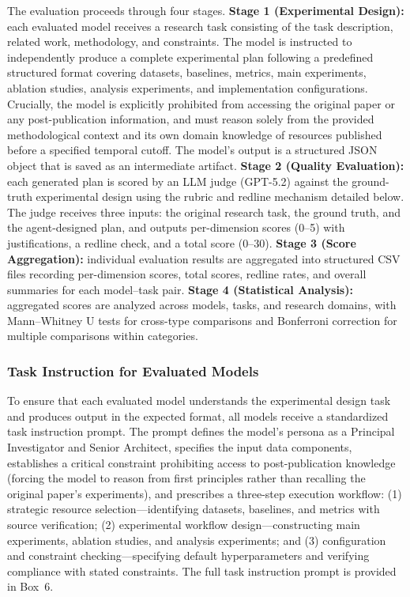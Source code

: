 The evaluation proceeds through four stages. \textbf{Stage 1 (Experimental Design):} each evaluated model receives a research task consisting of the task description, related work, methodology, and constraints. The model is instructed to independently produce a complete experimental plan following a predefined structured format covering datasets, baselines, metrics, main experiments, ablation studies, analysis experiments, and implementation configurations. Crucially, the model is explicitly prohibited from accessing the original paper or any post-publication information, and must reason solely from the provided methodological context and its own domain knowledge of resources published before a specified temporal cutoff. The model's output is a structured JSON object that is saved as an intermediate artifact. \textbf{Stage 2 (Quality Evaluation):} each generated plan is scored by an LLM judge (GPT-5.2) against the ground-truth experimental design using the rubric and redline mechanism detailed below. The judge receives three inputs: the original research task, the ground truth, and the agent-designed plan, and outputs per-dimension scores (0--5) with justifications, a redline check, and a total score (0--30). \textbf{Stage 3 (Score Aggregation):} individual evaluation results are aggregated into structured CSV files recording per-dimension scores, total scores, redline rates, and overall summaries for each model--task pair. \textbf{Stage 4 (Statistical Analysis):} aggregated scores are analyzed across models, tasks, and research domains, with Mann--Whitney U tests for cross-type comparisons and Bonferroni correction for multiple comparisons within categories.

\subsubsection{Task Instruction for Evaluated Models}

To ensure that each evaluated model understands the experimental design task and produces output in the expected format, all models receive a standardized task instruction prompt. The prompt defines the model's persona as a Principal Investigator and Senior Architect, specifies the input data components, establishes a critical constraint prohibiting access to post-publication knowledge (forcing the model to reason from first principles rather than recalling the original paper's experiments), and prescribes a three-step execution workflow: (1) strategic resource selection---identifying datasets, baselines, and metrics with source verification; (2) experimental workflow design---constructing main experiments, ablation studies, and analysis experiments; and (3) configuration and constraint checking---specifying default hyperparameters and verifying compliance with stated constraints. The full task instruction prompt is provided in Box~6.

